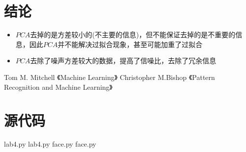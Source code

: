 \documentclass[UTF8]{ctexart}
\numberwithin{equation}{section}
\begin{document}
	\section{结论}
	
	\begin{itemize}
		\item $PCA$去掉的是方差较小的(不主要的信息)，但不能保证去掉的是不重要的信息，因此$PCA$并不能解决过拟合现象，甚至可能加重了过拟合
		\item $ PCA $去除了噪声方差较大的数据，提高了信噪比，去除了冗余信息
	\end{itemize}
	
	\begin{thebibliography}{99}
		 Tom M. Mitchell 《Machine Learning》
		 Christopher M.Bishop 《Pattern Recognition and Machine Learning》
	\end{thebibliography}
	\section{源代码}
	lab4.py
	 {lab4.py}
	face.py
	 {face.py}
\end{document}
